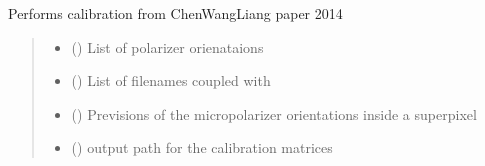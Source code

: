 \documentclass[letterpaper,10pt,english]{sphinxmanual}
\begin{document}
\begin{fulllineitems}
\label{\detokenize{micropolarray.processing:micropolarray.processing.chen_wan_liang_calibration.calculate_chen_wan_lian_calibration}}
\pysigstartsignatures
{}
\pysigstopsignatures
\sphinxAtStartPar
Performs calibration from Chen\sphinxhyphen{}Wang\sphinxhyphen{}Liang paper 2014
\begin{quote}\begin{description}
\begin{itemize}
\item {} 
\sphinxAtStartPar
{} (\sphinxstyleliteralemphasis{\sphinxupquote{{[}}}\sphinxstyleliteralemphasis{\sphinxupquote{{]}}}) \textendash{} List of polarizer orienataions

\item {} 
\sphinxAtStartPar
{} (\sphinxstyleliteralemphasis{\sphinxupquote{{[}}}\sphinxstyleliteralemphasis{\sphinxupquote{{]}}}) \textendash{} List of filenames coupled with

\item {} 
\sphinxAtStartPar
{} (\sphinxstyleliteralemphasis{\sphinxupquote{{[}}}\sphinxstyleliteralemphasis{\sphinxupquote{{]}}}) \textendash{} Previsions of the micropolarizer orientations inside a superpixel

\item {} 
\sphinxAtStartPar
{} () \textendash{} output path for the calibration matrices


\end{itemize}
\end{description}
\end{quote}
\end{fulllineitems}
\end{document}
